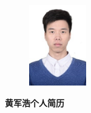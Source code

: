 \documentclass[UTF8,AutoFakeBold]{resume}
\begin{document}
    \begin{figure}[h]
        \flushright
        \includegraphics[height=3.5cm,width=2.5cm]{fonts/hjh.jpg}
    \end{figure}
\vspace{-0.175\linewidth}
    \begin{minipage}[t]{0.275\textwidth}
        \centering
        \LARGE\fangsong\textbf{{黄军浩{\small{\textbullet}}个人简历}}
    \end{minipage}
\vspace{3mm}
\par
\end{document}
